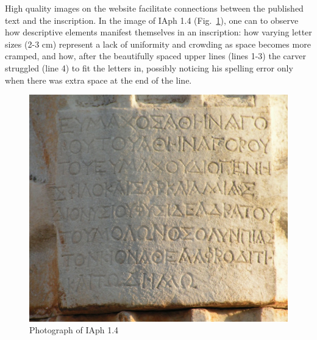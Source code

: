 \documentclass[amsthm,ebook]{saparticle}
\begin{document}
High quality images on the website facilitate connections between the published text and the inscription. In the image
of IAph 1.4 (Fig.~\ref{fig:2}), one can to observe how descriptive elements manifest themselves in an
inscription: how varying letter sizes (2-3 cm) represent a lack of uniformity and crowding as space becomes more
cramped, and how, after the beautifully spaced upper lines (lines 1-3) the carver struggled (line 4) to fit the letters
in, possibly noticing his spelling error only when there was extra space at the end of the line. \ 




\begin{figure}[!hbp]
\centering
 \includegraphics[width=\columnwidth]{PaperproposalforEAGLEfinal-img002.jpg}
\caption{Photograph of IAph 1.4}
\label{fig:2}
\end{figure}
\end{document}
